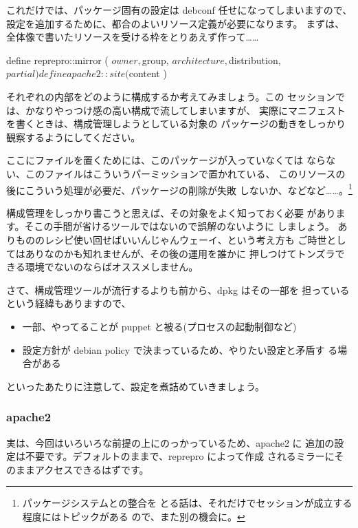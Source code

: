 \documentclass[mingoth,a4paper]{jsarticle}
\begin{document}
これだけでは、パッケージ固有の設定は debconf 任せになってしまいますので、
設定を追加するために、都合のよいリソース定義が必要になります。
まずは、全体像で書いたリソースを受ける枠をとりあえず作って……

\begin{commandline}
define reprepro::mirror (
  $owner,
  $group,
  $architecture,
  $distribution,
  $partial
  ) {

}

define apache2::site (
  $content
  ) {

}
\end{commandline}

それぞれの内部をどのように構成するか考えてみましょう。この
セッションでは、かなりやっつけ感の高い構成で流してしまいますが、
実際にマニフェストを書くときは、構成管理しようとしている対象の
パッケージの動きをしっかり観察するようにしてください。

ここにファイルを置くためには、このパッケージが入っていなくては
ならない、このファイルはこういうパーミッションで置かれている、
このリソースの後にこういう処理が必要だ、パッケージの削除が失敗
しないか、などなど……。\footnote{パッケージシステムとの整合を
とる話は、それだけでセッションが成立する程度にはトピックがある
ので、また別の機会に。}

構成管理をしっかり書こうと思えば、その対象をよく知っておく必要
があります。そこの手間が省けるツールではないので誤解のないように
しましょう。
ありもののレシピ使い回せばいいんじゃんウェーイ、という考え方も
ご時世としてはありなのかも知れませんが、その後の運用を誰かに
押しつけてトンズラできる環境でないのならばオススメしません。

さて、構成管理ツールが流行するよりも前から、dpkg はその一部を
担っているという経緯もありますので、

\begin{itemize}
\item 一部、やってることが puppet と被る(プロセスの起動制御など)
\item 設定方針が debian policy で決まっているため、やりたい設定と矛盾す
る場合がある
\end{itemize}

といったあたりに注意して、設定を煮詰めていきましょう。

\subsubsection{apache2}

実は、今回はいろいろな前提の上にのっかっているため、apache2 に
追加の設定は不要です。デフォルトのままで、reprepro によって作成
されるミラーにそのままアクセスできるはずです。
\end{document}
